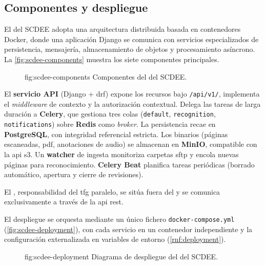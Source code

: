 \subsection{Componentes y despliegue}
\label{SS:DES-COMPONENTS}

El  del SCDEE adopta una arquitectura distribuida basada en
contenedores Docker, donde una aplicación Django se comunica con servicios
especializados de persistencia, mensajería, almacenamiento de objetos y
procesamiento asíncrono. La \cref{fig:scdee-components} muestra los siete
componentes principales.

\begin{figure}[Componentes del SCDEE]%
              {fig:scdee-components}%
              {Componentes del  del SCDEE.}
\end{figure}

El \textbf{servicio API} (Django + \acs{drf}) expone los recursos bajo
\texttt{/api/v1/}, implementa el \textit{middleware} de contexto
 y la autorización contextual. Delega las tareas de
larga duración a \textbf{Celery}, que gestiona tres colas
(\texttt{default}, \texttt{recognition}, \texttt{notifications}) sobre
\textbf{Redis} como \textit{broker}. La persistencia recae en
\textbf{PostgreSQL}, con integridad referencial estricta. Los binarios
(páginas escaneadas, \acs{pdf}, anotaciones de audio) se almacenan en
\textbf{MinIO}, compatible con la \ac{api} \ac{s3}. Un \textbf{watcher}
de ingesta monitoriza carpetas \acs{sftp} y encola nuevas páginas para
reconocimiento. \textbf{Celery Beat} planifica tareas periódicas (borrado
automático, apertura y cierre de revisiones).

El , responsabilidad del \acs{tfg} paralelo, se sitúa fuera
del  y se comunica exclusivamente a través de la
\acs{api} \acs{rest}.

El despliegue se orquesta mediante un único fichero
\texttt{docker-compose.yml} (\cref{fig:scdee-deployment}), con cada
servicio en un contenedor independiente y la configuración externalizada
en variables de entorno (\cref{rnf:deployment}).

\begin{figure}[Despliegue del SCDEE]%
              {fig:scdee-deployment}%
              {Diagrama de despliegue del  del SCDEE.}
\end{figure}
